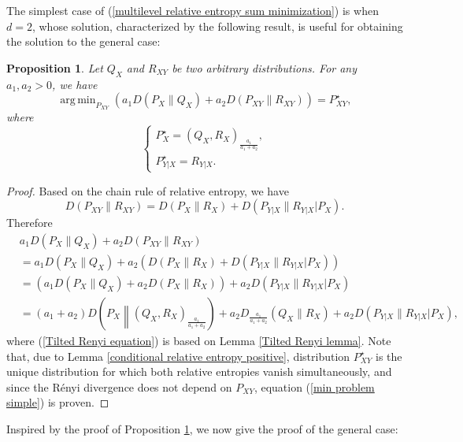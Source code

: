 \documentclass{article}
\DeclareMathOperator*{\argmin}{arg\,min}
\newtheorem{proposition}{Proposition}
\begin{document}
The simplest case of (\ref{multilevel relative entropy sum minimization}) is when $d=2$, whose solution, characterized by the following result, is useful for obtaining the solution to the general case:
\begin{proposition}\label{two term multilevel sum prop}
	Let $Q_X$ and $R_{XY}$ be two arbitrary distributions. For any $a_1,a_2> 0$, we have	
	\begin{equation}\label{min problem simple}
		\argmin_{P_{XY}} \left( a_1 D(P_X\|Q_X)+a_2 D(P_{XY}\|R_{XY})\right)=P^{\star}_{XY},
	\end{equation}
	where 
	\begin{equation}\nonumber
	\begin{cases}
		P^{\star}_X=(Q_X,R_X)_{\frac{a_1}{a_1+a_2}},\\
				P^{\star}_{Y|X}=R_{Y|X}.
	\end{cases} 
	\end{equation}
\end{proposition}
\begin{proof} 
	Based on the chain rule of relative entropy, we have
	\begin{equation}
	    D(P_{XY}\|R_{XY})=D(P_X\|R_X)+D(P_{Y|X}\|R_{Y|X}|P_X). \nonumber
	\end{equation}
	Therefore 
	\begin{align}
		&a_1 D(P_X\|Q_X)+a_2 D(P_{XY}\|R_{XY})\nonumber\\&=a_1D(P_X\|Q_X)+a_2(D(P_X\|R_X)+D(P_{Y|X}\|R_{Y|X}|P_X))\nonumber\\
				&=(a_1D(P_X\|Q_X)+a_2D(P_X\|R_X))+a_2D(P_{Y|X}\|R_{Y|X}|P_X) \nonumber\\
				&=(a_1+a_2)D\left(P_X\middle\|(Q_X,R_X)_{\frac{a_1}{a_1+a_2}}\right)+a_2D_{\frac{a_1}{a_1+a_2}}(Q_X\|R_X)+a_2 D(P_{Y|X}\|R_{Y|X}|P_X),\label{Tilted Renyi equation}	
	\end{align}
	where (\ref{Tilted Renyi equation}) is based on Lemma \ref{Tilted Renyi lemma}. Note that, due to Lemma \ref{conditional relative entropy positive}, distribution $P^{\star}_{XY}$ is the unique distribution for which both relative entropies vanish simultaneously, and since the R\'{e}nyi divergence does not depend on $P_{XY}$, equation (\ref{min problem simple}) is proven.
\end{proof}
Inspired by the proof of Proposition \ref{two term multilevel sum prop}, we now give the proof of the general case: 
\end{document}
